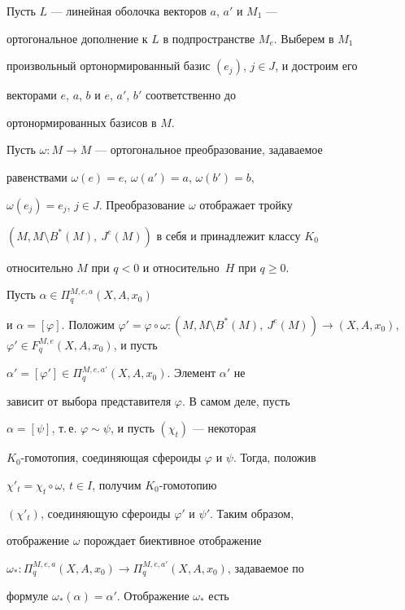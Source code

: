 \begin{pf} 


Пусть $L$ --- линейная оболочка векторов $a$, $a'$ и $M_1$ --- 


ортогональное дополнение к $L$ в подпространстве $M_e$. Выберем в $M_1$ 


произвольный ортонормированный базис $(e_j)$, $j\in J$, и достроим его 


векторами $e$, $a$, $b$ и $e$, $a'$, $b'$ соответственно до 


ортонормированных базисов в $M$. 


 


Пусть $\omega:M\to M$ --- ортогональное преобразование, задаваемое 


равенствами $\omega(e)=e$, $\omega(a')=a$, $\omega(b')=b$, 


$\omega(e_j)=e_j$, $j\in J$. Преобразование $\omega$ отображает тройку 


$(M,M\setminus B^*(M),\ J^e(M))$ в себя и принадлежит классу $K_0$


относительно $M$ при $q<0$ и относительно~$H$ при $q\ge0$. 


 


Пусть $\alpha\in\Pi^{M,e,a}_q(X,A,x_0)$ 


и $\alpha=[\varphi]$. Положим $\varphi'=\varphi\circ\omega:(M,M\setminus 


B^*(M),\ J^e(M))\to(X,A,x_0)$, $\varphi'\in F^{M,e}_q(X,A,x_0)$, и пусть 


$\alpha'=[\varphi']\in\Pi^{M,e,a'}_q(X,A,x_0)$. Элемент $\alpha'$ не 


зависит от выбора представителя $\varphi$. В самом деле, пусть 


$\alpha=[\psi]$, т.\,е. $\varphi\sim\psi$, и пусть $(\chi_t)$ --- некоторая 


$K_0$-гомотопия, соединяющая сфероиды $\varphi$ и $\psi$. Тогда, положив 


$\chi'_t=\chi_t\circ\omega$, $t\in I$, получим $K_0$-гомотопию 


$(\chi'_t)$, соединяющую сфероиды $\varphi'$ и $\psi'$. Таким образом, 


отображение $\omega$ порождает биективное отображение 


$\omega_*:\Pi^{M,e,a}_q(X,A,x_0)\to\Pi^{M,e,a'}_q(X,A,x_0)$, задаваемое по 


формуле $\omega_*(\alpha)=\alpha'$. Отображение $\omega_*$ есть 



\end{pf}
